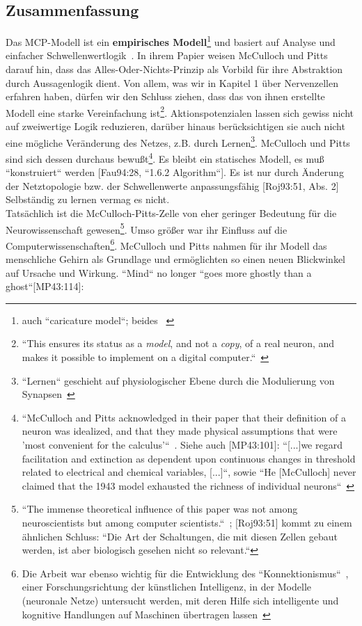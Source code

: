 {\clearpage
\pagebreak


\subsection{Zusammenfassung}\label{mcp-summary}

Das MCP-Modell ist ein \textbf{empirisches Modell}\footnote{
    auch ``caricature model``; beides ~\cite[4]{HI97}
} und basiert auf Analyse und einfacher Schwellenwertlogik~\cite[16]{AR88}.
In ihrem Papier weisen McCulloch und Pitts darauf hin, dass das Alles-Oder-Nichts-Prinzip als Vorbild für ihre Abstraktion durch Aussagenlogik dient.
Von allem, was wir in Kapitel 1 über Nervenzellen erfahren haben, dürfen wir den Schluss ziehen, dass das von ihnen erstellte Modell eine starke Vereinfachung ist\footnote{
    ``This ensures its status as a \textit{model}, and not a \textit{copy}, of a real neuron, and makes it possible to implement on a digital computer.``~\cite[43, Hervorhebungen i. O.]{BJ90}
}.
Aktionspotenzialen lassen sich gewiss nicht auf zweiwertige Logik reduzieren, darüber hinaus berücksichtigen sie auch nicht eine mögliche Veränderung des Netzes, z.B. durch Lernen\footnote{
    ``Lernen`` geschieht auf physiologischer Ebene durch die Modulierung von Synapsen~\cite[115]{HS19c}
}.
McCulloch und Pitts sind sich dessen durchaus bewußt\footnote{
    ``McCulloch and Pitts acknowledged in their paper that their definition of a neuron was idealized, and that they made physical assumptions that were 'most convenient for the calculus'``~\cite[21]{Abr02}. Siehe auch [MP43:101]: ``[...]we regard facilitation and extinction as dependent upon continuous changes in threshold related to electrical and chemical variables, [...]``, sowie ``He {[McCulloch]} never claimed that the 1943 model exhausted the richness of individual neurons``~\cite[11]{Arb19}
}.
Es bleibt ein statisches Modell, es muß ``konstruiert`` werden [Fau94:28, ``1.6.2 Algorithm``].
Es ist nur durch Änderung der Netztopologie bzw. der Schwellenwerte anpassungsfähig [Roj93:51, Abs. 2] Selbständig zu lernen vermag es nicht.\\


Tatsächlich ist die McCulloch-Pitts-Zelle von eher geringer Bedeutung für die Neurowissenschaft gewesen\footnote{
    ``The immense theoretical influence of this paper was not among neuroscientists but among computer scientists.``~\cite[17]{AR88}; [Roj93:51] kommt zu einem ähnlichen Schluss: ``Die Art der Schaltungen, die mit
    diesen Zellen gebaut werden, ist aber biologisch gesehen nicht so relevant.``
}.
Umso größer war ihr Einfluss auf die Computerwissenschaften\footnote{
    Die Arbeit war ebenso wichtig für die Entwicklung des ``Konnektionismus``~\cite[11]{Arb19}, einer Forschungsrichtung der künstlichen Intelligenz, in der Modelle (neuronale Netze) untersucht werden, mit deren Hilfe sich intelligente und kognitive Handlungen auf Maschinen übertragen lassen~\cite[v]{Dor91}
}.
McCulloch und Pitts nahmen für ihr Modell das menschliche Gehirn als Grundlage und ermöglichten so einen neuen Blickwinkel auf Ursache und Wirkung. ``Mind`` no longer ``goes more ghostly than a ghost``[MP43:114]:

}
